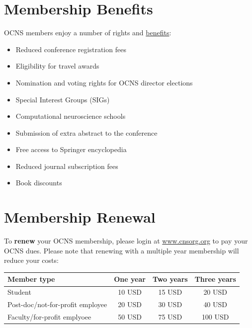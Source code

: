 \documentclass[11pt,a4paper,oneside]{article}
\begin{document}
\section*{Membership Benefits}%
\sectionauthor{\vspace{-4ex}}

OCNS members enjoy a number of rights and \href{https://www.cnsorg.org/member-benefits}{benefits}:
\begin{multicols}{2}
  \begin{itemize}
    \item Reduced conference registration fees
    \item Eligibility for travel awards
    \item Nomination and voting rights for OCNS director elections
    \item Special Interest Groups (SIGs)
    \item Computational neuroscience schools
    \item Submission of extra abstract to the conference
    \item Free access to Springer encyclopedia
    \item Reduced journal subscription fees
    \item Book discounts
  \end{itemize}
\end{multicols}

\section*{Membership Renewal}%
\sectionauthor{\vspace{-4ex}}

To \textbf{renew} your OCNS membership, please login at \href{www.cnsorg.org}{www.cnsorg.org} to pay your OCNS dues.
Please note that renewing with a multiple year membership will reduce your costs:

\begin{table}[!h]
  \centering
  \begin{tabularx}{0.7\textwidth}{X|ccc}
    \textbf{Member type}& \textbf{One year} & \textbf{Two years} & \textbf{Three years} \\
    \toprule{}
    Student & 10 USD & 15 USD & 20 USD \\
    Post-doc/not-for-profit employee & 20 USD & 30 USD & 40 USD \\
    Faculty/for-profit emplyoee& 50 USD & 75 USD & 100 USD \\
  \end{tabularx}
\end{table}
\end{document}
